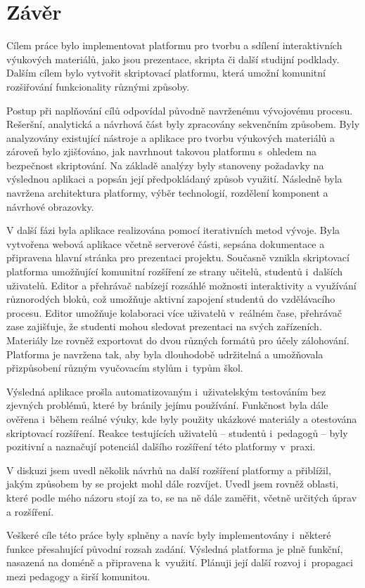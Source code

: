 \chapter*{Závěr}


Cílem práce bylo implementovat platformu pro tvorbu a sdílení interaktivních výukových materiálů, jako jsou prezentace, skripta či další studijní podklady. 
Dalším cílem bylo vytvořit skriptovací platformu, která umožní komunitní rozšiřování funkcionality různými způsoby.

Postup při naplňování cílů odpovídal původně navrženému vývojovému procesu. Rešeršní, analytická a návrhová část byly zpracovány sekvenčním způsobem. 
Byly analyzovány existující nástroje a aplikace pro tvorbu výukových materiálů a zároveň bylo zjišťováno, jak navrhnout takovou platformu s~ohledem na bezpečnost skriptování.
Na základě analýzy byly stanoveny požadavky na výslednou aplikaci a popsán její předpokládaný způsob využití. 
Následně byla navržena architektura platformy, výběr technologií, rozdělení komponent a návrhové obrazovky.

V další fázi byla aplikace realizována pomocí iterativních metod vývoje.
Byla vytvořena webová aplikace včetně serverové části, sepsána dokumentace a připravena hlavní stránka pro prezentaci projektu.
Současně vznikla skriptovací platforma umožňující komunitní rozšíření ze strany učitelů, studentů i~dalších uživatelů.
Editor a přehrávač nabízejí rozsáhlé možnosti interaktivity a využívání různorodých bloků, což umožňuje aktivní zapojení studentů do vzdělávacího procesu.
Editor umožňuje kolaboraci více uživatelů v~reálném čase, přehrávač zase zajišťuje, že studenti mohou sledovat prezentaci na svých zařízeních.
Materiály lze rovněž exportovat do dvou různých formátů pro účely zálohování. Platforma je navržena tak, aby byla dlouhodobě udržitelná a umožňovala přizpůsobení různým vyučovacím stylům i~typům škol.

Výsledná aplikace prošla automatizovaným i~uživatelským testováním bez zjevných problémů, které by bránily jejímu používání. 
Funkčnost byla dále ověřena i~během reálné výuky, kde byly použity ukázkové materiály a otestována skriptovací rozšíření. 
Reakce testujících uživatelů -- studentů i~pedagogů -- byly pozitivní a naznačují potenciál dalšího rozšíření této platformy v~praxi.

V diskuzi jsem uvedl několik návrhů na další rozšíření platformy a přiblížil, jakým způsobem by se projekt mohl dále rozvíjet.
Uvedl jsem rovněž oblasti, které podle mého názoru stojí za to, se na ně dále zaměřit, včetně určitých úprav a rozšíření.


Veškeré cíle této práce byly splněny a navíc byly implementovány i~některé funkce přesahující původní rozsah zadání.
Výsledná platforma je plně funkční, nasazená na doméně a připravena k~využití. 
Plánuji její další rozvoj i~propagaci mezi pedagogy a širší komunitou.
